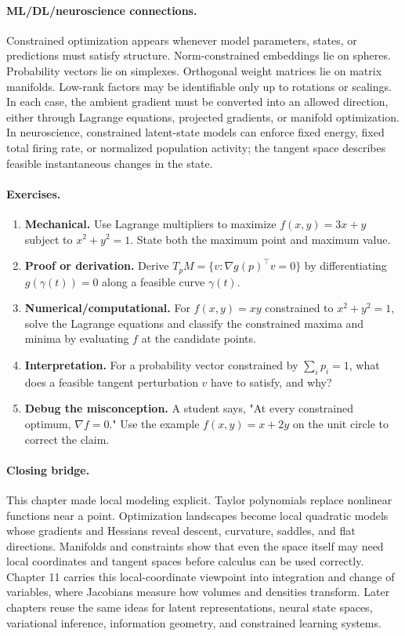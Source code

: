 \paragraph{ML/DL/neuroscience connections.}
Constrained optimization appears whenever model parameters, states, or predictions must satisfy structure. Norm-constrained embeddings lie on spheres. Probability vectors lie on simplexes. Orthogonal weight matrices lie on matrix manifolds. Low-rank factors may be identifiable only up to rotations or scalings. In each case, the ambient gradient must be converted into an allowed direction, either through Lagrange equations, projected gradients, or manifold optimization. In neuroscience, constrained latent-state models can enforce fixed energy, fixed total firing rate, or normalized population activity; the tangent space describes feasible instantaneous changes in the state.

\paragraph{Exercises.}
\begin{enumerate}[label=\textbf{10.4.\arabic*.}, leftmargin=*]
\item \textbf{Mechanical.} Use Lagrange multipliers to maximize \(f(x,y)=3x+y\) subject to \(x^2+y^2=1\). State both the maximum point and maximum value.
\item \textbf{Proof or derivation.} Derive \(T_pM=\{v:\nabla g(p)^\top v=0\}\) by differentiating \(g(\gamma(t))=0\) along a feasible curve \(\gamma(t)\).
\item \textbf{Numerical/computational.} For \(f(x,y)=xy\) constrained to \(x^2+y^2=1\), solve the Lagrange equations and classify the constrained maxima and minima by evaluating \(f\) at the candidate points.
\item \textbf{Interpretation.} For a probability vector constrained by \(\sum_i p_i=1\), what does a feasible tangent perturbation \(v\) have to satisfy, and why?
\item \textbf{Debug the misconception.} A student says, "At every constrained optimum, \(\nabla f=0\)." Use the example \(f(x,y)=x+2y\) on the unit circle to correct the claim.
\end{enumerate}

\paragraph{Closing bridge.}
This chapter made local modeling explicit. Taylor polynomials replace nonlinear functions near a point. Optimization landscapes become local quadratic models whose gradients and Hessians reveal descent, curvature, saddles, and flat directions. Manifolds and constraints show that even the space itself may need local coordinates and tangent spaces before calculus can be used correctly. Chapter 11 carries this local-coordinate viewpoint into integration and change of variables, where Jacobians measure how volumes and densities transform. Later chapters reuse the same ideas for latent representations, neural state spaces, variational inference, information geometry, and constrained learning systems.

\clearpage
